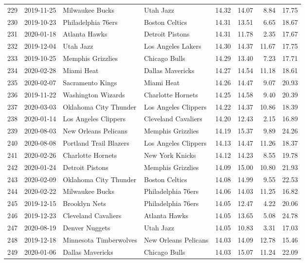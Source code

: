 \documentclass[
  11pt,
]{article}
\theoremstyle{nonumberplain}
\begin{document}
\begin{longtable}{rl|llr|rrr}
229 & 2019-11-25 & Milwaukee Bucks & Utah Jazz & 14.32 & 14.07 & 8.84 & 17.75\\
230 & 2019-10-23 & Philadelphia 76ers & Boston Celtics & 14.31 & 13.51 & 6.65 & 18.67\\
231 & 2020-01-18 & Atlanta Hawks & Detroit Pistons & 14.31 & 11.78 & 2.35 & 17.67\\
232 & 2019-12-04 & Utah Jazz & Los Angeles Lakers & 14.30 & 14.37 & 11.67 & 17.75\\
233 & 2019-10-25 & Memphis Grizzlies & Chicago Bulls & 14.29 & 13.40 & 7.23 & 17.71\\
234 & 2020-02-28 & Miami Heat & Dallas Mavericks & 14.27 & 14.54 & 11.18 & 18.61\\
235 & 2020-02-07 & Sacramento Kings & Miami Heat & 14.26 & 14.47 & 9.07 & 20.93\\
236 & 2019-11-22 & Washington Wizards & Charlotte Hornets & 14.25 & 14.58 & 9.40 & 20.39\\
237 & 2020-03-03 & Oklahoma City Thunder & Los Angeles Clippers & 14.22 & 14.37 & 10.86 & 18.39\\
238 & 2020-01-14 & Los Angeles Clippers & Cleveland Cavaliers & 14.20 & 12.43 & 2.15 & 16.89\\
239 & 2020-08-03 & New Orleans Pelicans & Memphis Grizzlies & 14.19 & 15.37 & 9.89 & 24.26\\
240 & 2020-08-08 & Portland Trail Blazers & Los Angeles Clippers & 14.13 & 14.47 & 11.26 & 18.37\\
241 & 2020-02-26 & Charlotte Hornets & New York Knicks & 14.12 & 14.23 & 8.55 & 19.78\\
242 & 2020-01-24 & Detroit Pistons & Memphis Grizzlies & 14.09 & 15.00 & 10.80 & 21.93\\
243 & 2020-02-09 & Oklahoma City Thunder & Boston Celtics & 14.08 & 14.99 & 9.55 & 22.53\\
244 & 2020-02-22 & Milwaukee Bucks & Philadelphia 76ers & 14.06 & 14.03 & 11.25 & 16.82\\
245 & 2019-12-15 & Brooklyn Nets & Philadelphia 76ers & 14.05 & 12.47 & 4.22 & 20.06\\
246 & 2019-12-23 & Cleveland Cavaliers & Atlanta Hawks & 14.05 & 13.65 & 5.08 & 24.78\\
247 & 2020-08-19 & Denver Nuggets & Utah Jazz & 14.05 & 10.83 & 3.31 & 17.03\\
248 & 2019-12-18 & Minnesota Timberwolves & New Orleans Pelicans & 14.03 & 14.09 & 12.78 & 15.46\\
249 & 2020-01-06 & Dallas Mavericks & Chicago Bulls & 14.03 & 15.07 & 11.24 & 22.09\\

\end{longtable}
\end{document}
